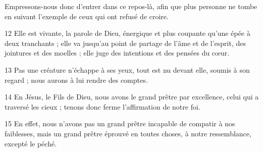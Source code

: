 Empressons-nous donc d’entrer dans ce repos-là, afin que plus personne ne tombe en suivant l’exemple de ceux qui ont refusé de croire.

12 Elle est vivante, la parole de Dieu, énergique et plus coupante qu’une épée à deux tranchants ; elle va jusqu’au point de partage de l’âme et de l’esprit, des jointures et des moelles ; elle juge des intentions et des pensées du cœur.

13 Pas une créature n’échappe à ses yeux, tout est nu devant elle, soumis à son regard ; nous aurons à lui rendre des comptes.

14 En Jésus, le Fils de Dieu, nous avons le grand prêtre par excellence, celui qui a traversé les cieux ; tenons donc ferme l’affirmation de notre foi.

15 En effet, nous n’avons pas un grand prêtre incapable de compatir à nos faiblesses, mais un grand prêtre éprouvé en toutes choses, à notre ressemblance, excepté le péché.
